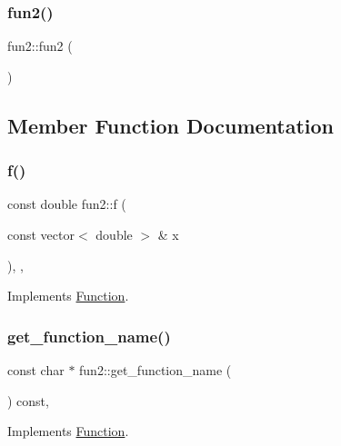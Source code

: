 \subsubsection{\texorpdfstring{fun2()}{fun2()}}
{\footnotesize\ttfamily fun2\+::fun2 (\begin{DoxyParamCaption}{ }\end{DoxyParamCaption})}



\subsection{Member Function Documentation}
\mbox{\label{classfun2_a8c363f61d3161648813004cfc341cbd1}} 
\subsubsection{\texorpdfstring{f()}{f()}}
{\footnotesize\ttfamily const double fun2\+::f (\begin{DoxyParamCaption}\item[{const vector$<$ double $>$ \&}]{x }\end{DoxyParamCaption})\hspace{0.3cm}{\ttfamily [inline]}, {\ttfamily [override]}, {\ttfamily [virtual]}}



Implements \hyperlink{class_function_ae700c7cb44bd2048d712466767be2803}{Function}.

\mbox{\label{classfun2_ad46fa2b40e24f7c13ea765f8ff5f9c24}} 
\subsubsection{\texorpdfstring{get\+\_\+function\+\_\+name()}{get\_function\_name()}}
{\footnotesize\ttfamily const char $\ast$ fun2\+::get\+\_\+function\+\_\+name (\begin{DoxyParamCaption}{ }\end{DoxyParamCaption}) const\hspace{0.3cm}{\ttfamily [override]}, {\ttfamily [virtual]}}



Implements \hyperlink{class_function_a928c579622c47d98e91477ef18dec199}{Function}.

